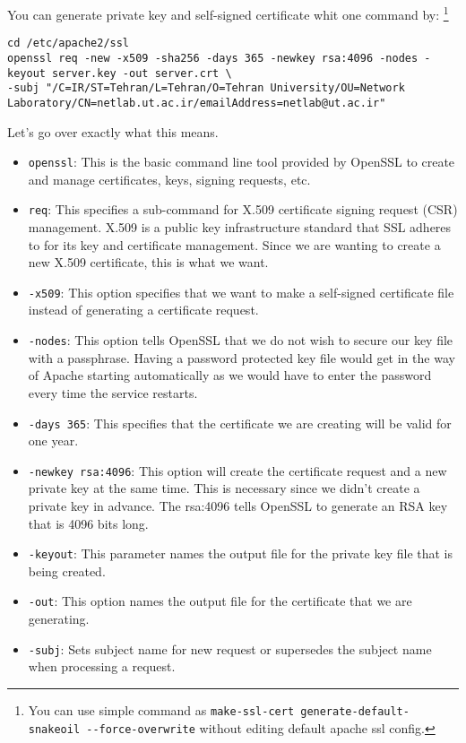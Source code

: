 \documentclass{../UTNetLab}
\begin{document}
    You can generate private key and self-signed certificate whit one command by:
    \footnote{You can use simple command as \lstinline{make-ssl-cert generate-default-snakeoil --force-overwrite} without editing default apache ssl config.}
    \begin{lstlisting}[emph={server,key,crt},morekeywords={[2]req},escapechar={}]
cd /etc/apache2/ssl
openssl req -new -x509 -sha256 -days 365 -newkey rsa:4096 -nodes -keyout server.key -out server.crt \
-subj "/C=IR/ST=Tehran/L=Tehran/O=Tehran University/OU=Network Laboratory/CN=netlab.ut.ac.ir/emailAddress=netlab@ut.ac.ir"
    \end{lstlisting}

        Let's go over exactly what this means.

        \begin{itemize}
            \item \lstinline{openssl}: This is the basic command line tool provided by OpenSSL to create and manage certificates, keys, signing requests, etc.
            \item \lstinline{req}: This specifies a sub-command for X.509 certificate signing request (CSR) management.
                X.509 is a public key infrastructure standard that SSL adheres to for its key and certificate management.
                Since we are wanting to create a new X.509 certificate, this is what we want.
            \item \lstinline{-x509}: This option specifies that we want to make a self-signed certificate file instead of generating a certificate request.
            \item \lstinline{-nodes}: This option tells OpenSSL that we do not wish to secure our key file with a passphrase.
                Having a password protected key file would get in the way of Apache starting automatically as we would have to enter the password every time the service restarts.
            \item \lstinline{-days 365}: This specifies that the certificate we are creating will be valid for one year.
            \item \lstinline{-newkey rsa:4096}: This option will create the certificate request and a new private key at the same time.
                This is necessary since we didn't create a private key in advance.
                The rsa:4096 tells OpenSSL to generate an RSA key that is 4096 bits long.
            \item \lstinline{-keyout}: This parameter names the output file for the private key file that is being created.
            \item \lstinline{-out}: This option names the output file for the certificate that we are generating.
            \item \lstinline{-subj}: Sets subject name for new request or supersedes the subject name when processing a request.
        \end{itemize}
\end{document}
